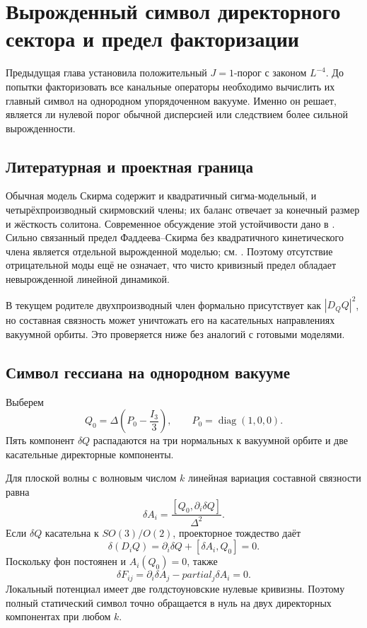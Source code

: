 \chapter{Вырожденный символ директорного сектора и предел факторизации}

Предыдущая глава установила положительный $J=1$-порог с законом
$L^{-4}$. До попытки факторизовать все канальные операторы необходимо
вычислить их главный символ на однородном упорядоченном вакууме. Именно он
решает, является ли нулевой порог обычной дисперсией или следствием более
сильной вырожденности.

\section{Литературная и проектная граница}

Обычная модель Скирма содержит и квадратичный сигма-модельный, и
четырёхпроизводный скирмовский члены; их баланс отвечает за конечный размер
и жёсткость солитона. Современное обсуждение этой устойчивости дано в
. Сильно связанный предел Фаддеева--Скирма без
квадратичного кинетического члена является отдельной вырожденной моделью;
см. . Поэтому отсутствие отрицательной моды ещё не
означает, что чисто кривизный предел обладает невырожденной линейной
динамикой.

В текущем родителе двухпроизводный член формально присутствует как
$|D_QQ|^2$, но составная связность может уничтожать его на касательных
направлениях вакуумной орбиты. Это проверяется ниже без аналогий с готовыми
моделями.

\section{Символ гессиана на однородном вакууме}

Выберем
\begin{equation}
 Q_0=\Delta\left(P_0-\frac{I_3}{3}\right),
 \qquad P_0=\operatorname{diag}(1,0,0).
\end{equation}
Пять компонент $\delta Q$ распадаются на три нормальных к вакуумной
орбите и две касательные директорные компоненты.

Для плоской волны с волновым числом $k$ линейная вариация составной
связности равна
\begin{equation}
 \delta A_i=\frac{[Q_0,\partial_i\delta Q]}{\Delta^2}.
\end{equation}
Если $\delta Q$ касательна к $SO(3)/O(2)$, проекторное тождество даёт
\begin{equation}
 \delta(D_iQ)=
 \partial_i\delta Q+[\delta A_i,Q_0]=0.
 \label{eq:v6-tangent-DQ-symbol-zero}
\end{equation}
Поскольку фон постоянен и $A_i(Q_0)=0$, также
\begin{equation}
 \delta F_{ij}=\partial_i\delta A_j-partial_j\delta A_i=0.
 \label{eq:v6-tangent-F-symbol-zero}
\end{equation}
Локальный потенциал имеет две голдстоуновские нулевые кривизны. Поэтому
полный статический символ точно обращается в нуль на двух директорных
компонентах при любом $k$.

